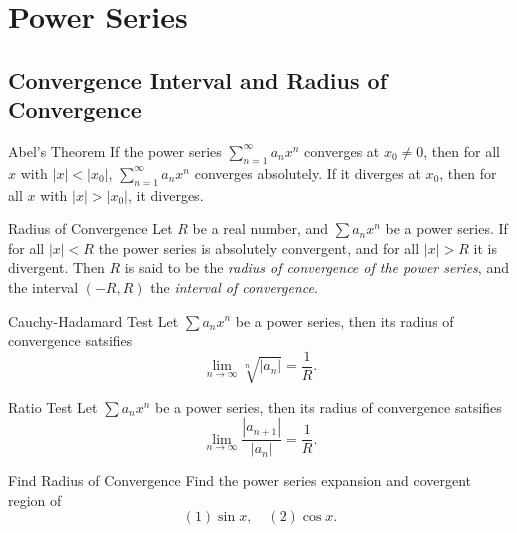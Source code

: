 \section{Power Series}

\subsection{Convergence Interval and Radius of Convergence}

\begin{theorem}{Abel's Theorem}{}
  If the power series $\sum\limits_{n = 1}^{\infty} a_nx^n$
  converges at $x_0 \neq 0$,
  then for all $x$ with $|x| < |x_0|$,
  $\sum\limits_{n = 1}^{\infty} a_nx^n$ converges absolutely.
  If it diverges at $x_0$,
  then for all $x$ with $|x| > |x_0|$, it diverges.
\end{theorem}

\begin{definition}{Radius of Convergence}{}
 Let $R$ be a real number, and $\sum a_nx^n$ be a power series.
 If for all $|x| < R$ the power series is absolutely convergent,
 and for all $|x| > R$ it is divergent.
 Then $R$ is said to be the \emph{radius of convergence of the power series},
 and the interval $(-R, R)$ the \emph{interval of convergence}.
\end{definition}

\begin{proposition}{Cauchy-Hadamard Test}{}
  Let $\sum a_nx^n$ be a power series, then its radius of convergence satsifies
  \begin{equation}
    \lim \limits _{n \rightarrow \infty} \sqrt[n]{|a_n|} = \frac{1}{R}.
  \end{equation}
\end{proposition}

\begin{proposition}{Ratio Test}{}
  Let $\sum a_nx^n$ be a power series, then its radius of convergence satsifies
  \begin{equation}
    \lim \limits _{n \rightarrow \infty} \frac{|a_{n+1}|}{|a_n|} = \frac{1}{R}.
  \end{equation}
\end{proposition}

\begin{example}{Find Radius of Convergence}{}
  Find the power series expansion and covergent region of
  \begin{equation}
    (1) \sin x, \quad
    (2) \cos x.
  \end{equation}
\end{example}

